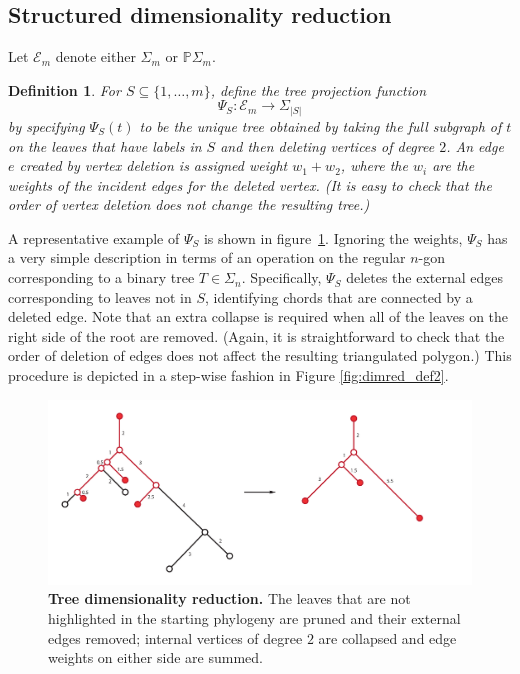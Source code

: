 \documentclass[a4paper,11pt]{article}
\newtheorem{definition}{Definition}
\newcommand{\aE}{\mathcal{E}}
\begin{document}
\subsection{Structured dimensionality reduction}

Let $\aE_m$ denote either $\Sigma_m$ or $\mathbb{P}\Sigma_m$.  

\begin{definition}
For $S \subseteq \{1,\ldots,m\}$, define the tree projection function 
\[
\Psi_S \colon \aE_m \to \Sigma_{|S|}
\] 
by specifying $\Psi_S(t)$ to be the unique tree obtained by taking the full subgraph of $t$ on the leaves that have labels in $S$ and then deleting vertices of degree $2$.
An edge $e$ created by vertex deletion is assigned weight $w_1 + w_2$, where the $w_i$ are the weights of the incident edges for the deleted vertex.
(It is easy to check that the order of vertex deletion does not change the resulting tree.)
\end{definition}

A representative example of $\Psi_S$ is shown in figure~\ref{fig:dimred_tree-dim-red}.
Ignoring the weights, $\Psi_S$ has a very simple description in terms of an operation on the regular $n$-gon corresponding to a binary tree $T \in \Sigma_n$.
Specifically, $\Psi_S$ deletes the external edges corresponding to leaves not in $S$, identifying chords that are connected by a deleted edge.
Note that an extra collapse is required when all of the leaves on the right side of the root are removed.
(Again, it is straightforward to check that the order of deletion of edges does not affect the resulting triangulated polygon.)
This procedure is depicted in a step-wise fashion in Figure \ref{fig:dimred_def2}.

\begin{figure}
    \centering
    \includegraphics[width=6in]{../figures/dimred_tree-dim-red.pdf}
    \caption{{\bf Tree dimensionality reduction.} The leaves that are not highlighted in the starting phylogeny are pruned and their external edges removed; internal vertices of degree $2$ are collapsed and edge weights on either side are summed.}
    \label{fig:dimred_tree-dim-red}
\end{figure} 
\end{document}
